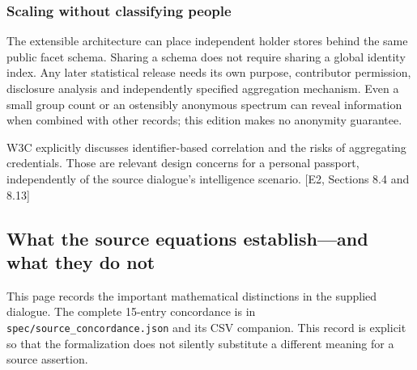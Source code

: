 \documentclass[11pt,a4paper]{article}
\newcommand{\newpagehead}[1]{\clearpage\subsection{#1}}
\newcommand{\source}[1]{{\sffamily\small\color{slate}[#1]}}
\begin{document}
\subsubsection{Scaling without classifying people}
The extensible architecture can place independent holder stores behind the same public facet schema. Sharing a schema does not require sharing a global identity index. Any later statistical release needs its own purpose, contributor permission, disclosure analysis and independently specified aggregation mechanism. Even a small group count or an ostensibly anonymous spectrum can reveal information when combined with other records; this edition makes no anonymity guarantee.

W3C explicitly discusses identifier-based correlation and the risks of aggregating credentials. Those are relevant design concerns for a personal passport, independently of the source dialogue's intelligence scenario. \source{E2, Sections 8.4 and 8.13}

\newpagehead{What the source equations establish—and what they do not}
This page records the important mathematical distinctions in the supplied dialogue. The complete 15-entry concordance is in \texttt{spec/source\_concordance.json} and its CSV companion. This record is explicit so that the formalization does not silently substitute a different meaning for a source assertion.
\end{document}
